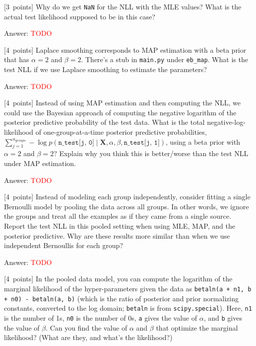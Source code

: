 \documentclass{article}
\newcommand{\ask}[1]{\textcolor{question}{#1}}
\newenvironment{answer}{\par\begingroup\color{answer}Answer: }{\endgroup}
\newcommand{\red}[1]{\textcolor{red}{#1}}
\newcommand{\pts}[1]{\textcolor{points}{[#1~points]}}
\newcommand{\TODO}{\red{TODO}}
\newcommand{\bX}{\mathbf{X}}
\begin{document}
\begin{qlist}
\item \pts{3}
    \ask{Why do we get \texttt{NaN} for the NLL with the MLE values?
         What is the actual test likelihood supposed to be in this case?}

\begin{answer}\TODO\end{answer}


\item \pts{4}
    Laplace smoothing corresponds to MAP estimation with a beta prior that has $\alpha=2$ and $\beta=2$.
    There's a stub in \texttt{main.py} under \texttt{eb\_map}.
    \ask{What is the test NLL if we use Laplace smoothing to estimate the parameters?} 

\begin{answer}\TODO\end{answer}

\item \pts{4}
    Instead of using MAP estimation and then computing the NLL,
    we could use the Bayesian approach of computing the negative logarithm of the posterior predictive probability of the test data.
    \ask{%
      What is the total negative-log-likelihood of one-group-at-a-time posterior predictive probabilities,
      $\sum_{j=1}^{n_\mathit{groups}} -\log p( \texttt{n\_test[j, 0]} \mid \bX, \alpha, \beta, \texttt{n\_test[j, 1]})$,
      using a beta prior with $\alpha=2$ and $\beta=2$?
      Explain why you think this is better/worse than the test NLL under MAP estimation.}

\begin{answer}\TODO\end{answer}

\item \pts{4}
    Instead of modeling each group independently,
    consider fitting a single Bernoulli model by pooling the data across all groups.
    In other words, we ignore the groups and treat all the examples as if they came from a single source.
    \ask{%
      Report the test NLL in this pooled setting when using MLE, MAP, and the posterior predictive.
      Why are these results more similar than when we use independent Bernoullis for each group?
    }

\begin{answer}\TODO\end{answer}

\item \pts{4}
    In the pooled data model,
    you can compute the logarithm of the marginal likelihood of the hyper-parameters given the data as \texttt{betaln(a + n1, b + n0) - betaln(a, b)}
    (which is the ratio of posterior and prior normalizing constants, converted to the log domain; \texttt{betaln} is from \texttt{scipy.special}).
    Here, \texttt{n1} is the number of 1s, \texttt{n0} is the number of 0s, \texttt{a} gives the value of $\alpha$, and \texttt{b} gives the value of $\beta$.
    \ask{Can you find the value of $\alpha$ and $\beta$ that optimize the marginal likelihood? (What are they, and what's the likelihood?)}


\end{qlist}
\end{document}
